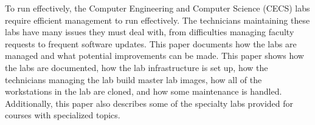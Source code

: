 \thispagestyle{empty}

To run effectively, the Computer Engineering and Computer Science (CECS) labs require efficient management to run effectively. The technicians maintaining these labs have many issues they must deal with, from difficulties managing faculty requests to frequent software updates. This paper documents how the labs are managed and what potential improvements can be made. 
This paper shows how the labs are documented, how the lab infrastructure is set up, how the technicians managing the lab build master lab images, how all of the workstations in the lab are cloned, and how some maintenance is handled.  Additionally, this paper also describes some of the specialty labs provided for courses with specialized topics. 
